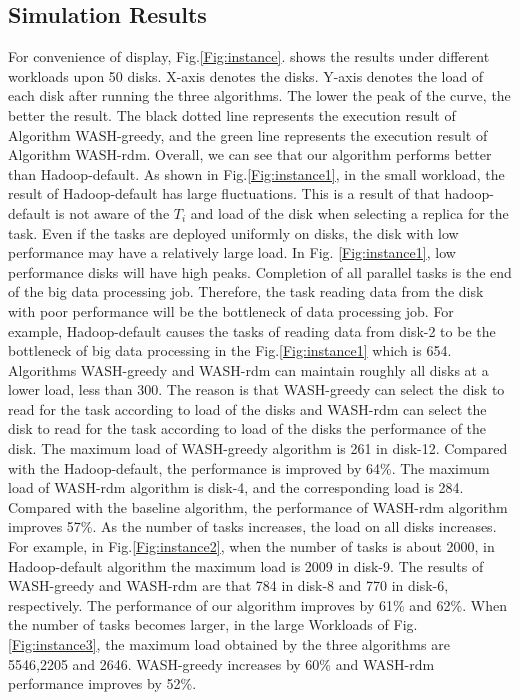 \documentclass[conference]{IEEEtran}
\begin{document}
\subsection{Simulation Results}

For convenience of display, Fig.\ref{Fig:instance}. shows the results under different workloads upon 50 disks. X-axis denotes the disks. Y-axis denotes the load of each disk after running the three algorithms. The lower the peak of the curve, the better the result. The black dotted line represents the execution result of Algorithm WASH-greedy, and the green line represents the execution result of Algorithm WASH-rdm. Overall, we can see that our algorithm performs better than Hadoop-default. As shown in Fig.\ref{Fig:instance1}, in the small workload, the result of Hadoop-default has large fluctuations. This is a result of that hadoop-default is not aware of the $T_i$ and load of the disk when selecting a replica for the task. Even if the tasks are deployed uniformly on disks, the disk with low performance may have a relatively large load. In Fig. \ref{Fig:instance1}, low performance disks will have high peaks. Completion of all parallel tasks is the end of the big data processing job. Therefore, the task reading data from the disk with poor performance will be the bottleneck of data processing job. For example, Hadoop-default causes the tasks of reading data from disk-2 to be the bottleneck of big data processing in the Fig.\ref{Fig:instance1} which is 654. Algorithms WASH-greedy and WASH-rdm can maintain roughly all disks at a lower load, less than 300. The reason is that WASH-greedy can select the disk to read for the task according to load of the disks and WASH-rdm can select the disk to read for the task according to load of the disks the performance of the disk. The maximum load of WASH-greedy algorithm is 261 in disk-12. Compared with the Hadoop-default, the performance is improved by 64\%. The maximum load of WASH-rdm algorithm is disk-4, and the corresponding load is 284. Compared with the baseline algorithm, the performance of WASH-rdm algorithm improves 57\%.
As the number of tasks increases, the load on all disks increases. For example, in Fig.\ref{Fig:instance2}, when the number of tasks is about 2000, in Hadoop-default algorithm the maximum load is 2009 in disk-9. The results of WASH-greedy and WASH-rdm are that 784 in disk-8  and 770 in disk-6, respectively. The performance of our algorithm improves by 61\% and 62\%. 
When the number of tasks becomes larger, in the large Workloads of Fig. \ref{Fig:instance3}, the maximum load obtained by the three algorithms are 5546,2205 and 2646. WASH-greedy increases by 60\% and WASH-rdm performance improves by 52\%.
 
\end{document}
